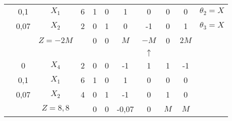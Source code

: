 \begin{tabular}{ccccccccccc}
            & 0,1     & $X_1$   & 6       & 1       & 0       & 1       & 0       & 0       & 0       & $\theta_2 = X$ \\
            & 0,07    & $X_2$   & 2       & 0       & 1       & 0       & -1      & 0       & 1       & $\theta_3 = X$ \bigstrut[b]\\
\cline{2-11}            &         & $Z=-2M$ &         & 0       & 0       & $M$     & \textcolor[rgb]{ 0,  .439,  .753}{\boldmath{}\textbf{$-M$}\unboldmath{}} & 0       & $2M$    &  \bigstrut\\
\cline{2-11}            &         &         &         &         &         &         & $\uparrow$ &         &         &  \bigstrut\\
\cline{2-11}            & 0       & $X_4$   & 2       & 0       & 0       & -1      & 1       & 1       & -1      &  \bigstrut[t]\\
            & 0,1     & $X_1$   & 6       & 1       & 0       & 1       & 0       & 0       & 0       &  \\
            & 0,07    & $X_2$   & 4       & 0       & 1       & -1      & 0       & 1       & 0       &  \bigstrut[b]\\
\cline{2-10}            &         & $Z=8,8$ &         & 0       & 0       & -0,07   & 0       & $M$     & $M$     &  \bigstrut\\
\cline{2-10}    \end{tabular}%
